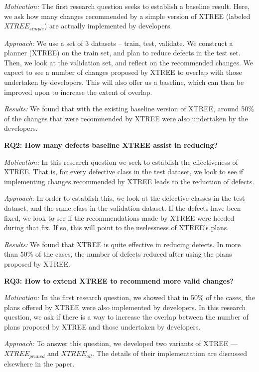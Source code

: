 \documentclass[sigconf, proceedings, 9pt]{acmart}
\begin{document}
\textit{Motivation:} The first research question seeks to establish a baseline 
result. Here, we ask how many changes recommended by a simple version of XTREE 
(labeled $XTREE_{simple}$) are actually implemented by developers.


\textit{Approach:} We use a set of 3 datasets -- train, test, validate. We 
construct a planner (XTREE) on the train set, and plan to reduce defects in the 
test set. Then, we look at the validation set, and reflect on the recommended 
changes. We expect to see a number of changes proposed by XTREE to overlap with 
those undertaken by developers. This will also offer us a baseline, which can 
then be improved upon to increase the extent of overlap.


\textit{Results:} We found that with the existing baseline version of XTREE, 
around 50\% of the changes that were recommended by XTREE were also undertaken 
by the developers.


\item[] \textbf{\noindent RQ2: How many defects baseline XTREE assist in 
reducing?}


\textit{Motivation:} In this research question we seek to establish the 
effectiveness of XTREE. That is, for every defective class in the test dataset, 
we look to see if implementing changes recommended by XTREE leads to the 
reduction of defects.


\textit{Approach:} In order to establish this, we look at the defective classes 
in the test dataset, and the same class in the validation dataset. If the 
defects have been fixed, we look to see if the recommendations made by XTREE 
were heeded during that fix. If so, this will point to the uselessness of 
XTREE's plans.

\textit{Results:} We found that XTREE is quite effective in reducing defects. 
In more than 50\% of the cases, the number of defects reduced after using the 
plans proposed by XTREE.


\item[] \textbf{\noindent RQ3: How to extend XTREE to recommend more valid 
changes?} 


\textit{Motivation:} In the first research question, we showed that in 50\% of 
the cases, the plans offered by XTREE were also implemented by developers. In 
this research question, we ask if there is a way to increase the overlap 
between the number of plans proposed by XTREE and those undertaken by 
developers.


\textit{Approach:} To answer this question, we developed two variants of XTREE 
--- $XTREE_{pruned}$ and $XTREE_{all}$. The details of their implementation are 
discussed elsewhere in the paper. 
\end{document}
